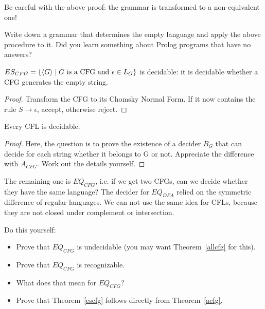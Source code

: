 Be careful with the above proof: the grammar is transformed to a
non-equivalent one!

\begin{exercise}
Write down a grammar that determines the empty language and apply the
above procedure to it. Did you learn something about Prolog programs
that have no answers?
\end{exercise}

\begin{theorem} \label{escfg}
$ES_{CFG} = \{\langle G \rangle\mid \text{$G$ is a CFG and $\epsilon\in L_G$}\}$ is
    decidable: it is decidable whether a CFG generates the empty string.
\end{theorem}
\begin{proof}
Transform the CFG to its Chomsky Normal Form. If it now contains the
rule $S \rightarrow \epsilon$, accept, otherwise reject.
\end{proof}

\begin{theorem}
Every CFL is decidable.
\end{theorem}
\begin{proof}
Here, the question is to prove the existence of a decider $B_G$ that
can decide for each string whether it belongs to G or not. Appreciate
the difference with $A_{CFG}$. Work out the details yourself.
\end{proof}

The remaining one is $EQ_{CFG}$, i.e. if we get two CFGs, can we
decide whether they have the same language? The decider for $EQ_{DFA}$
relied on the symmetric difference of regular languages. We can not
use the same idea for CFLs, because they are not closed under
complement or intersection.

\begin{exercise}
Do this yourself:
\begin{itemize}
\item Prove that $EQ_{CFG}$ is undecidable (you may want Theorem~\ref{allcfg} for this).

\item Prove that $\overline{EQ_{CFG}}$ is recognizable.

\item What does that mean for $EQ_{CFG}$?

\item Prove that Theorem~\ref{escfg} follows directly from Theorem~\ref{acfg}.
\end{itemize}
\end{exercise}

